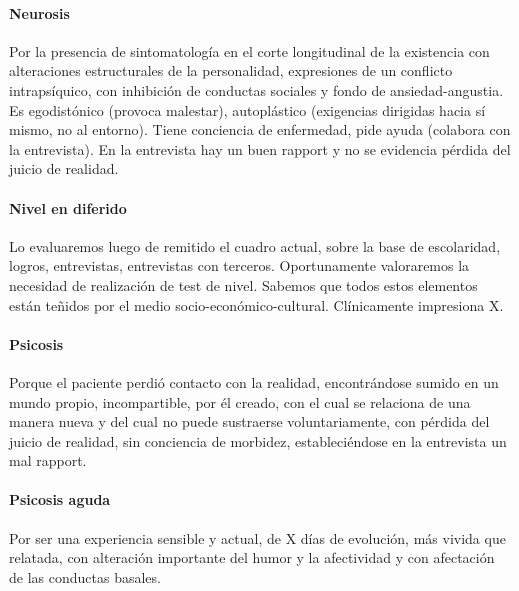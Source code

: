 \documentclass{scrbook}
\begin{document}
\paragraph{Neurosis}
\faCut Por la presencia de sintomatología en el corte longitudinal de la existencia con alteraciones estructurales de la personalidad, expresiones de un conflicto intrapsíquico, con inhibición de conductas sociales y fondo de ansiedad-angustia. Es egodistónico (provoca malestar), autoplástico (exigencias dirigidas hacia sí mismo, no al entorno). Tiene conciencia de enfermedad, pide ayuda (colabora con la entrevista). En la entrevista hay un buen rapport y no se evidencia pérdida del juicio de realidad.

\paragraph{Nivel en diferido}
\faCut Lo evaluaremos luego de remitido el cuadro actual, sobre la base de escolaridad, logros, entrevistas, entrevistas con terceros. Oportunamente valoraremos la necesidad de realización de test de nivel. Sabemos que todos estos elementos están teñidos por el medio socio-económico-cultural. Clínicamente impresiona X.

\paragraph{Psicosis}
\faCut Porque el paciente perdió contacto con la realidad, encontrándose sumido en un mundo propio, incompartible, por él creado, con el cual se relaciona de una manera nueva y del cual no puede sustraerse voluntariamente, con pérdida del juicio de realidad, sin conciencia de morbidez, estableciéndose en la entrevista un mal rapport.

\paragraph{Psicosis aguda}
\faCut Por ser una experiencia sensible y actual, de X días de evolución, más vivida que relatada, con alteración importante del humor y la afectividad y con afectación de las conductas basales.
\end{document}
